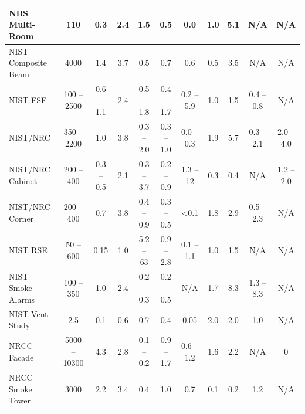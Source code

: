 \begin{landscape}
\begin{longtable}{|l|c|c|c|c|c|c|c|c|c|c|}
NBS Multi-Room      & 110           & 0.3           & 2.4   & 1.5               & 0.5                 & 0.0           & 1.0         & 5.1         & N/A                   & N/A                   \\ \hline
NIST Composite Beam & 4000          & 1.4           & 3.7   & 0.5               & 0.7                 & 0.6           & 0.5         & 3.5         & N/A                   & N/A                   \\ \hline
NIST FSE            & 100 -- 2500   & 0.6 -- 1.1    & 2.4   & 0.5 -- 1.8        & 0.4 -- 1.7          & 0.2 -- 5.9    & 1.0         & 1.5         & 0.4 -- 0.8            & N/A                   \\ \hline
NIST/NRC            & 350 -- 2200   & 1.0           & 3.8   & 0.3 -- 2.0        & 0.3 -- 1.0          & 0.0 -- 0.3    & 1.9         & 5.7         & 0.3 -- 2.1            & 2.0 -- 4.0            \\ \hline
NIST/NRC Cabinet    & 200 -- 400    & 0.3 -- 0.5    & 2.1   & 0.3 -- 3.7        & 0.2 -- 0.9          & 1.3 -- 12     & 0.3         & 0.4         & N/A                   & 1.2 -- 2.0            \\ \hline
NIST/NRC Corner     & 200 -- 400    & 0.7           & 3.8   & 0.4 -- 0.9        & 0.3 -- 0.5          & <0.1          & 1.8         & 2.9         & 0.5 -- 2.3            & N/A                   \\ \hline
NIST RSE            & 50 -- 600     & 0.15          & 1.0   & 5.2 -- 63         & 0.9 -- 2.8          & 0.1 -- 1.1    & 1.0         & 1.5         & N/A                   & N/A                   \\ \hline
NIST Smoke Alarms   & 100 -- 350    & 1.0           & 2.4   & 0.2 -- 0.3        & 0.2 -- 0.5          & N/A           & 1.7         & 8.3         & 1.3 -- 8.3            & N/A                   \\ \hline
NIST Vent Study     & 2.5           & 0.1           & 0.6   & 0.7               & 0.4                 & 0.05          & 2.0         & 2.0         & 1.0                   & N/A                   \\ \hline
NRCC Facade         & 5000 -- 10300 & 4.3           & 2.8   & 0.1 -- 0.2        & 0.9 -- 1.7          & 0.6 -- 1.2    & 1.6         & 2.2         & N/A                   & 0                     \\ \hline
NRCC Smoke Tower    & 3000          & 2.2           & 3.4   & 0.4               & 1.0                 & 0.7           & 0.1         & 0.2         & 1.2                   & N/A                   \\ \hline

\end{longtable}
\end{landscape}
